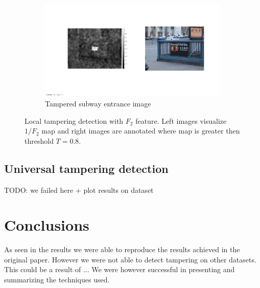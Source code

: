 \documentclass{template/acm_proc_article-sp}
\begin{document}
\begin{figure}
\begin{subfigure}{0.46\textwidth}
    \includegraphics[trim=275 300 200 250,clip,width=\linewidth]{report/results/f2_subway.jpg}
    \caption{Tampered subway entrance image}
\end{subfigure}

\caption{Local tampering detection with $F_2$ feature. Left images visualize $1/F_2$ map and right images are annotated where map is greater then threshold $T = 0.8$.}
\label{img_f2_localization}
\end{figure}

\subsection{Universal tampering detection}

TODO: we failed here + plot results on dataset

\section{Conclusions}
As seen in the results we were able to reproduce the results achieved in the 
original paper. However we were not able to detect tampering on other datasets.
This could be a result of ...
We were however successful in presenting and summarizing the techniques used.



\end{document}
